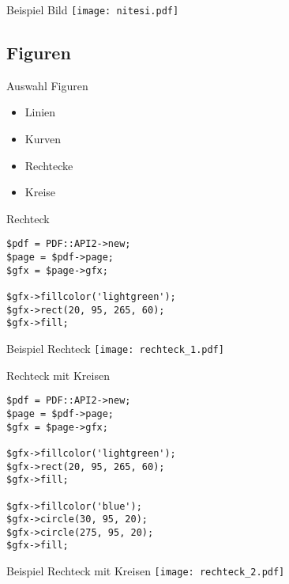 \begin{frame}{Beispiel Bild}
\texttt{[image: nitesi.pdf]}
\end{frame}

\subsection{Figuren}
\begin{frame}{Auswahl Figuren}
\begin{itemize}
\item Linien
\item Kurven
\item Rechtecke
\item Kreise
\end{itemize}
\end{frame}

\begin{frame}[fragile]{Rechteck}
\begin{lstlisting}
$pdf = PDF::API2->new;
$page = $pdf->page;
$gfx = $page->gfx;

$gfx->fillcolor('lightgreen');
$gfx->rect(20, 95, 265, 60);
$gfx->fill;
\end{lstlisting}
\end{frame}

\begin{frame}{Beispiel Rechteck}
\texttt{[image: rechteck\_1.pdf]}
\end{frame}

\begin{frame}[fragile]{Rechteck mit Kreisen}
\begin{lstlisting}
$pdf = PDF::API2->new;
$page = $pdf->page;
$gfx = $page->gfx;

$gfx->fillcolor('lightgreen');
$gfx->rect(20, 95, 265, 60);
$gfx->fill;

$gfx->fillcolor('blue');
$gfx->circle(30, 95, 20);
$gfx->circle(275, 95, 20);
$gfx->fill;
\end{lstlisting}
\end{frame}

\begin{frame}{Beispiel Rechteck mit Kreisen}
\texttt{[image: rechteck\_2.pdf]}
\end{frame}


